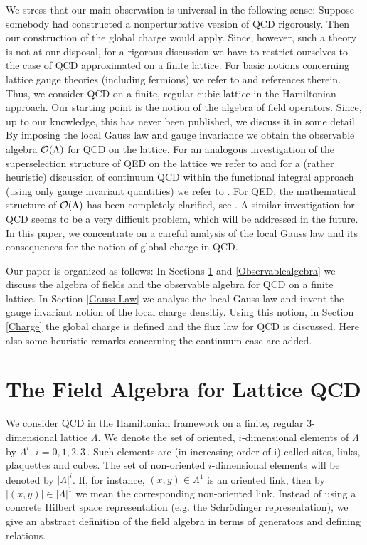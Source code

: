 \documentclass[a4paper,12pt]{article}
\begin{document}
We stress that our main observation is universal in the following
sense: Suppose somebody had constructed a nonperturbative version
of QCD rigorously. Then our construction of the global charge
would apply. Since, however, such a theory is not at our disposal,
for a rigorous discussion we have to restrict ourselves to the
case of QCD approximated on a finite lattice. For basic notions
concerning lattice gauge theories (including fermions) we refer to
\cite{Seiler} and references therein. Thus, we consider QCD  on a
finite, regular cubic lattice in the Hamiltonian approach. Our
starting point is the notion of the algebra of field operators.
Since, up to our knowledge, this has never been published, we
discuss it in some detail. By imposing the local Gauss law and
gauge invariance we obtain the observable algebra ${\cal
O}(\Lambda )$ for QCD on the lattice. For an analogous
investigation of the superselection structure of QED on the
lattice we refer to \cite{KRT} and for a (rather heuristic)
discussion of continuum QCD within the functional integral
approach (using only gauge invariant quantities) we refer to
\cite{KRR}. For QED, the mathematical structure of ${\cal
O}(\Lambda )$ has been completely clarified, see \cite{KRS}. A
similar investigation for QCD seems to be a very difficult
problem, which will be addressed in the future. In this paper, we
concentrate on a careful analysis of the local Gauss law and its
consequences for the notion of global charge in QCD.

Our paper is organized as follows: In Sections \ref{Algebra} and
\ref{Observablealgebra} we discuss the algebra of fields and the
observable algebra for QCD on a finite lattice. In Section
\ref{Gauss Law} we analyse the local Gauss law and invent the
gauge invariant notion of the local charge densitiy. Using this
notion, in Section \ref{Charge} the global charge is defined and
the flux law for QCD is discussed. Here also some heuristic
remarks concerning the continuum case are added.





\setcounter{equation}{0}
\section{The Field Algebra for Lattice QCD}
\label{Algebra}



We consider QCD in the Hamiltonian framework on a finite, regular
3-dimensional lattice $\Lambda$. We denote the set of oriented,
$i$-dimensional elements of $\Lambda$ by ${\Lambda}^i$, $i =
0,1,2,3 \, .$ Such elements are (in increasing order of i) called
sites, links, plaquettes and cubes. The set of non-oriented
$i$-dimensional elements will be denoted by $|{\Lambda}|^i$. If,
for instance, $(x,y) \in {\Lambda}^1$  is an oriented link, then
by $|(x,y)| \in |{\Lambda}|^1$ we mean the corresponding
non-oriented link. Instead of using a concrete Hilbert space
representation (e.g. the Schr\"odinger representation), we give an
abstract definition of the field algebra in terms of generators
and defining relations.
\end{document}
